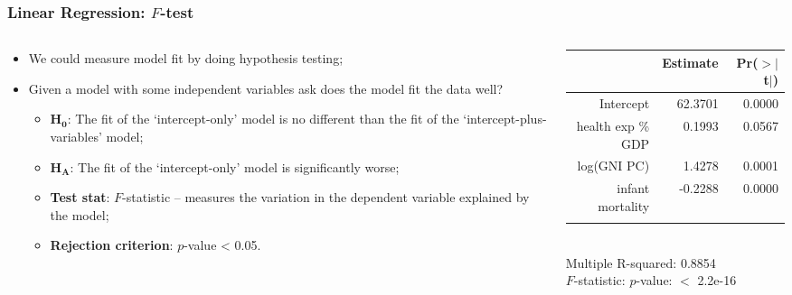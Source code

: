 \documentclass[aspectratio=169]{beamer}
\theoremstyle{principle}
\begin{document}
\begin{frame}
\frametitle{Linear Regression: $F$-test}

\begin{columns}
\begin{column}{0.5\textwidth}

\begin{itemize}
\item We could measure model fit by doing hypothesis testing;
\bigskip
\bigskip

\item Given a model with some independent variables ask does the model fit the data well?
\begin{itemize}
\item $\mathbf{H_0}$: \color{white}The fit of the `intercept-only' model is no different than the fit of the `intercept-plus-variables' model;\color{black}
\item $\mathbf{H_A}$: \color{white}The fit of the `intercept-only' model is significantly worse;\color{black}
\item \textbf{Test stat}: \color{white}$F$-statistic -- measures the variation in the dependent variable explained by the model;\color{black}
\item \textbf{Rejection criterion}: \color{white}$p$-value < 0.05.
\end{itemize}


\end{itemize}

\end{column}
\begin{column}{0.5\textwidth}

\begin{table}[ht]
\centering
\begin{tabular}{rrr}
  \hline
   \hline
 & Estimate & Pr($>$$|$t$|$) \\ 
  \hline
   \hline
Intercept & 62.3701 & 0.0000 \\ 
  health exp \% GDP & 0.1993 & 0.0567 \\ 
  log(GNI PC) & 1.4278 & 0.0001 \\ 
  infant mortality & -0.2288 & 0.0000 \\ 
   \hline
   \hline
   &&\\
\end{tabular}\\
Multiple R-squared:  0.8854\\ 
\color{white}$F$-statistic: $p$-value: $<$ 2.2e-16
\end{table}

\end{column}
\end{columns}

\end{frame}
\end{document}
